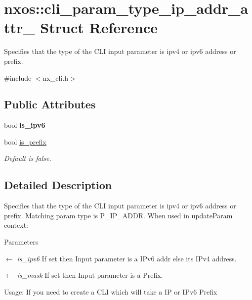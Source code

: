 \hypertarget{structnxos_1_1cli__param__type__ip__addr__attr__}{
\section{nxos::cli\_\-param\_\-type\_\-ip\_\-addr\_\-attr\_\- Struct Reference}
\label{structnxos_1_1cli__param__type__ip__addr__attr__}
}


Specifies that the type of the CLI input parameter is ipv4 or ipv6 address or prefix.  


{\ttfamily \#include $<$nx\_\-cli.h$>$}\subsection*{Public Attributes}
\begin{DoxyCompactItemize}
\item 
\hypertarget{structnxos_1_1cli__param__type__ip__addr__attr___a767316999a46b9f012b818131455980b}{
bool {\bfseries is\_\-ipv6}}
\label{structnxos_1_1cli__param__type__ip__addr__attr___a767316999a46b9f012b818131455980b}

\item 
\hypertarget{structnxos_1_1cli__param__type__ip__addr__attr___a0a059b592a9bc394c9fed521fb5a9552}{
bool \hyperlink{structnxos_1_1cli__param__type__ip__addr__attr___a0a059b592a9bc394c9fed521fb5a9552}{is\_\-prefix}}
\label{structnxos_1_1cli__param__type__ip__addr__attr___a0a059b592a9bc394c9fed521fb5a9552}

\begin{DoxyCompactList}\small\item\em Default is false. \item\end{DoxyCompactList}\end{DoxyCompactItemize}


\subsection{Detailed Description}
Specifies that the type of the CLI input parameter is ipv4 or ipv6 address or prefix. Matching param type is P\_\-IP\_\-ADDR. When used in updateParam context: 
\begin{DoxyParams}{Parameters}
\item[\mbox{$\leftarrow$} {\em is\_\-ipv6}]If set then Input parameter is a IPv6 addr else its IPv4 address. \item[\mbox{$\leftarrow$} {\em is\_\-mask}]If set then Input parameter is a Prefix.\end{DoxyParams}
Usage: If you need to create a CLI which will take a IP or IPv6 Prefix

